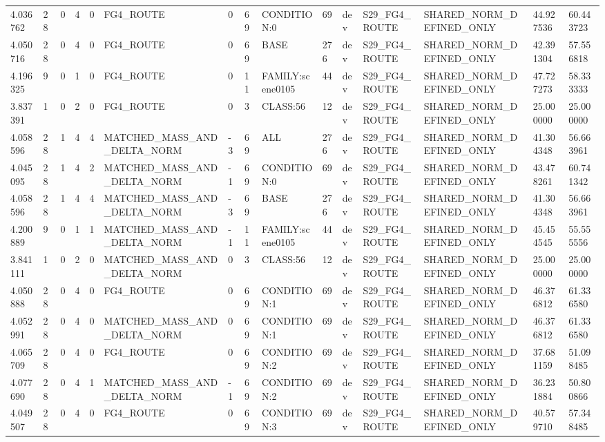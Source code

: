\begin{tabular}{lllllllllllllll}
4.036762 & 28 & 0 & 4 & 0 & FG4\_ROUTE & 0 & 69 & CONDITION:0 & 69 & dev & S29\_FG4\_ROUTE & SHARED\_NORM\_DEFINED\_ONLY & 44.927536 & 60.443723 \\
4.050716 & 28 & 0 & 4 & 0 & FG4\_ROUTE & 0 & 69 & BASE & 276 & dev & S29\_FG4\_ROUTE & SHARED\_NORM\_DEFINED\_ONLY & 42.391304 & 57.556818 \\
4.196325 & 9 & 0 & 1 & 0 & FG4\_ROUTE & 0 & 11 & FAMILY:scene0105 & 44 & dev & S29\_FG4\_ROUTE & SHARED\_NORM\_DEFINED\_ONLY & 47.727273 & 58.333333 \\
3.837391 & 1 & 0 & 2 & 0 & FG4\_ROUTE & 0 & 3 & CLASS:56 & 12 & dev & S29\_FG4\_ROUTE & SHARED\_NORM\_DEFINED\_ONLY & 25.000000 & 25.000000 \\
4.058596 & 28 & 1 & 4 & 4 & MATCHED\_MASS\_AND\_DELTA\_NORM & -3 & 69 & ALL & 276 & dev & S29\_FG4\_ROUTE & SHARED\_NORM\_DEFINED\_ONLY & 41.304348 & 56.663961 \\
4.045095 & 28 & 1 & 4 & 2 & MATCHED\_MASS\_AND\_DELTA\_NORM & -1 & 69 & CONDITION:0 & 69 & dev & S29\_FG4\_ROUTE & SHARED\_NORM\_DEFINED\_ONLY & 43.478261 & 60.741342 \\
4.058596 & 28 & 1 & 4 & 4 & MATCHED\_MASS\_AND\_DELTA\_NORM & -3 & 69 & BASE & 276 & dev & S29\_FG4\_ROUTE & SHARED\_NORM\_DEFINED\_ONLY & 41.304348 & 56.663961 \\
4.200889 & 9 & 0 & 1 & 1 & MATCHED\_MASS\_AND\_DELTA\_NORM & -1 & 11 & FAMILY:scene0105 & 44 & dev & S29\_FG4\_ROUTE & SHARED\_NORM\_DEFINED\_ONLY & 45.454545 & 55.555556 \\
3.841111 & 1 & 0 & 2 & 0 & MATCHED\_MASS\_AND\_DELTA\_NORM & 0 & 3 & CLASS:56 & 12 & dev & S29\_FG4\_ROUTE & SHARED\_NORM\_DEFINED\_ONLY & 25.000000 & 25.000000 \\
4.050888 & 28 & 0 & 4 & 0 & FG4\_ROUTE & 0 & 69 & CONDITION:1 & 69 & dev & S29\_FG4\_ROUTE & SHARED\_NORM\_DEFINED\_ONLY & 46.376812 & 61.336580 \\
4.052991 & 28 & 0 & 4 & 0 & MATCHED\_MASS\_AND\_DELTA\_NORM & 0 & 69 & CONDITION:1 & 69 & dev & S29\_FG4\_ROUTE & SHARED\_NORM\_DEFINED\_ONLY & 46.376812 & 61.336580 \\
4.065709 & 28 & 0 & 4 & 0 & FG4\_ROUTE & 0 & 69 & CONDITION:2 & 69 & dev & S29\_FG4\_ROUTE & SHARED\_NORM\_DEFINED\_ONLY & 37.681159 & 51.098485 \\
4.077690 & 28 & 0 & 4 & 1 & MATCHED\_MASS\_AND\_DELTA\_NORM & -1 & 69 & CONDITION:2 & 69 & dev & S29\_FG4\_ROUTE & SHARED\_NORM\_DEFINED\_ONLY & 36.231884 & 50.800866 \\
4.049507 & 28 & 0 & 4 & 0 & FG4\_ROUTE & 0 & 69 & CONDITION:3 & 69 & dev & S29\_FG4\_ROUTE & SHARED\_NORM\_DEFINED\_ONLY & 40.579710 & 57.348485 \\

\end{tabular}
